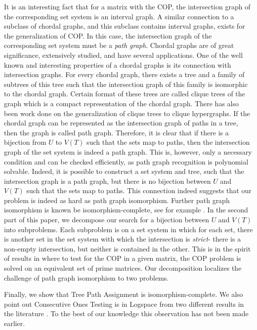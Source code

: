 \documentclass{llncs}
\begin{document}
\noindent
It is an interesting fact that for a matrix with the COP, the
intersection graph of the corresponding set system is an interval
graph.  A similar connection to a subclass of chordal graphs, and this
subclass contains interval graphs, exists for the generalization of
COP.  In this case, the intersection graph of the corresponding set
system must be a {\em path graph}. Chordal graphs are of great
significance, extensively studied, and have several applications.  One
of the well known and interesting properties of a chordal graphs is
its connection with intersection graphs\cite{mcg04}. For every chordal
graph, there exists a tree and a family of subtrees of this tree such
that the intersection graph of this family is isomorphic to the
chordal graph\cite{plr70,gav78,bp93}.  Certain format of these trees
are called clique trees\cite{apy92} of the graph which is a compact
representation of the chordal graph. There has also been work done on
the generalization of clique trees to clique hypergraphs\cite{km02}.
If the chordal graph can be represented as the intersection graph of
paths in a tree, then the graph is called path graph\cite{mcg04}.
Therefore, it is clear that if there is a bijection from $U$ to $V(T)$
such that the sets map to paths, then the intersection graph of the
set system is indeed a path graph.  This is, however, only a necessary
condition and can be checked efficiently, as path graph recognition is
polynomial solvable\cite{gav78,aas93}.  Indeed, it is possible to
construct a set system and tree, such that the intersection graph is a
path graph, but there is no bijection between $U$ and $V(T)$ such that
the sets map to paths.  This connection indeed suggests that our
problem is indeed as hard as path graph isomorphism.  Further path
graph isomorphism is known be isomorphism-complete, see for example
\cite{kklv10}.  In the second part of this paper, we decompose our
search for a bijection between $U$ and $V(T)$ into subproblems.  Each
subproblem is on a set system in which for each set, there is another
set in the set system with which the intersection is {\em strict}-
there is a non-empty intersection, but neither is contained in the
other.  This is in the spirit of results in \cite{wlh02,nsnrs09} where
to test for the COP in a given matrix, the COP problem is solved on an
equivalent set of prime matrices.  Our decomposition localizes the
challenge of path graph isomorphism to two problems.

Finally, we show that Tree Path Assignment is isomorphism-complete.
We also point out Consecutive Ones Testing is in Logspace from two
different results in the literature \cite{kklv10, mcc04}. To the best
of our knowledge this observation has not been made earlier.
\end{document}
